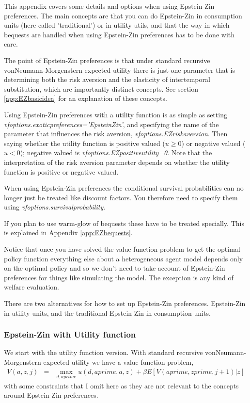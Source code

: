 \label{app:EpsteinZin}
This appendix covers some details and options when using Epstein-Zin preferences. The main concepts are that you can do Epstein-Zin in consumption units (here called 'traditional') or in utility utils, and that the way in which bequests are handled when using Epstein-Zin preferences has to be done with care.

The point of Epstein-Zin preferences is that under standard recursive vonNeumann-Morgenstern expected utility there is just one parameter that is determining both the risk aversion and the elasticity of intertemporal substitution, which are importantly distinct concepts. See section \ref{app:EZbasicidea} for an explanation of these concepts.

Using Epstein-Zin preferences with a utility function is as simple as setting \textit{vfoptions.exoticpreferences='EpsteinZin'}, and specifying the name of the parameter that influences the risk aversion, \textit{vfoptions.EZriskaversion}. Then saying whether the utility function is positive valued ($u\geq0$) or negative valued ($u<0$); negative valued is \textit{vfoptions.EZpositiveutility=0}. Note that the interpretation of the risk aversion parameter depends on whether the utility function is positive or negative valued.

When using Epstein-Zin preferences the conditional survival probabilities can no longer just be treated like discount factors. You therefore need to specify them using \textit{vfoptions.survivalprobability}.

If you plan to use warm-glow of bequests these have to be treated specially. This is explained in Appendix \ref{app:EZbequests}.

Notice that once you have solved the value function problem to get the optimal policy function everything else about a heterogeneous agent model depends only on the optimal policy and so we don't need to take account of Epstein-Zin preferences for things like simulating the model. The exception is any kind of welfare evaluation.

There are two alternatives for how to set up Epstein-Zin preferences. Epstein-Zin in utility units, and the traditional Epstein-Zin in consumption units.

\subsubsection{Epstein-Zin with Utility function}
We start with the utility function version. With standard recursive vonNeumann-Morgenstern expected utility we have a value function problem,
\begin{eqnarray*}
 V(a,z,j)&=& \max_{d,aprime} u(d,aprime,a,z) + \beta E[V(aprime,zprime,j+1)|z]
\end{eqnarray*}
with some constraints that I omit here as they are not relevant to the concepts around Epstein-Zin preferences.

